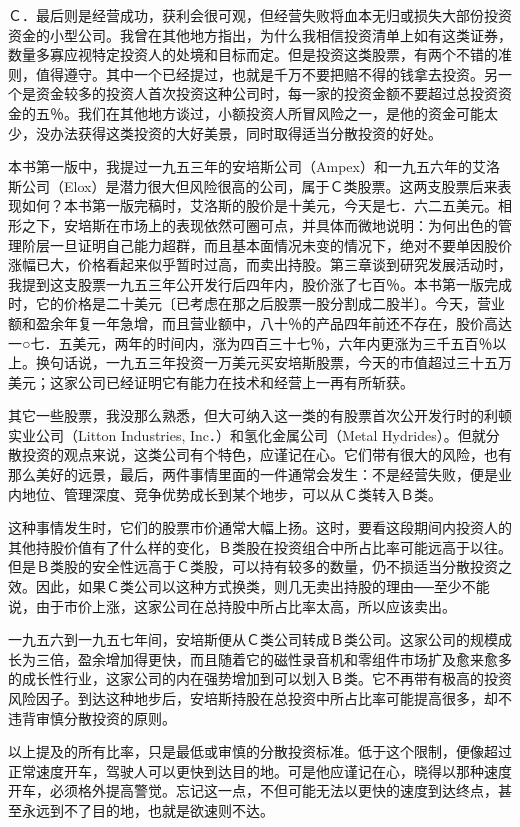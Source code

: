 \documentclass[UTF8,a4paper,zihao=-4,fontset = windows]{ctexart} %
\begin{document}
Ｃ．最后则是经营成功，获利会很可观，但经营失败将血本无归或损失大部份投资资金的小型公司。我曾在其他地方指出，为什么我相信投资清单上如有这类证券，数量多寡应视特定投资人的处境和目标而定。但是投资这类股票，有两个不错的准则，值得遵守。其中一个已经提过，也就是千万不要把赔不得的钱拿去投资。另一个是资金较多的投资人首次投资这种公司时，每一家的投资金额不要超过总投资资金的五％。我们在其他地方谈过，小额投资人所冒风险之一，是他的资金可能太少，没办法获得这类投资的大好美景，同时取得适当分散投资的好处。

本书第一版中，我提过一九五三年的安培斯公司（Ampex）和一九五六年的艾洛斯公司（Elox）是潜力很大但风险很高的公司，属于Ｃ类股票。这两支股票后来表现如何？本书第一版完稿时，艾洛斯的股价是十美元，今天是七．六二五美元。相形之下，安培斯在市场上的表现依然可圈可点，并具体而微地说明：为何出色的管理阶层一旦证明自己能力超群，而且基本面情况未变的情况下，绝对不要单因股价涨幅已大，价格看起来似乎暂时过高，而卖出持股。第三章谈到研究发展活动时，我提到这支股票一九五三年公开发行后四年内，股价涨了七百％。本书第一版完成时，它的价格是二十美元〔已考虑在那之后股票一股分割成二股半〕。今天，营业额和盈余年复一年急增，而且营业额中，八十％的产品四年前还不存在，股价高达一○七．五美元，两年的时间内，涨为四百三十七％，六年内更涨为三千五百％以上。换句话说，一九五三年投资一万美元买安培斯股票，今天的市值超过三十五万美元；这家公司已经证明它有能力在技术和经营上一再有所斩获。

其它一些股票，我没那么熟悉，但大可纳入这一类的有股票首次公开发行时的利顿实业公司（Litton Industries, Inc．）和氢化金属公司（Metal Hydrides）。但就分散投资的观点来说，这类公司有个特色，应谨记在心。它们带有很大的风险，也有那么美好的远景，最后，两件事情里面的一件通常会发生：不是经营失败，便是业内地位、管理深度、竞争优势成长到某个地步，可以从Ｃ类转入Ｂ类。

这种事情发生时，它们的股票市价通常大幅上扬。这时，要看这段期间内投资人的其他持股价值有了什么样的变化，Ｂ类股在投资组合中所占比率可能远高于以往。但是Ｂ类股的安全性远高于Ｃ类股，可以持有较多的数量，仍不损适当分散投资之效。因此，如果Ｃ类公司以这种方式换类，则几无卖出持股的理由──至少不能说，由于市价上涨，这家公司在总持股中所占比率太高，所以应该卖出。

一九五六到一九五七年间，安培斯便从Ｃ类公司转成Ｂ类公司。这家公司的规模成长为三倍，盈余增加得更快，而且随着它的磁性录音机和零组件市场扩及愈来愈多的成长性行业，这家公司的内在强势增加到可以划入Ｂ类。它不再带有极高的投资风险因子。到达这种地步后，安培斯持股在总投资中所占比率可能提高很多，却不违背审慎分散投资的原则。

以上提及的所有比率，只是最低或审慎的分散投资标准。低于这个限制，便像超过正常速度开车，驾驶人可以更快到达目的地。可是他应谨记在心，晓得以那种速度开车，必须格外提高警觉。忘记这一点，不但可能无法以更快的速度到达终点，甚至永远到不了目的地，也就是欲速则不达。
\end{document}
